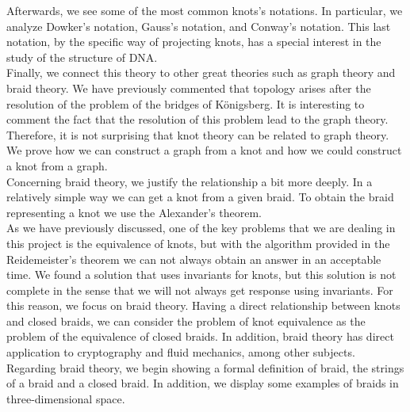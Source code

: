 Afterwards, we see some of the most common knots’s notations. In particular, we analyze Dowker's notation, Gauss's notation, and Conway's notation. This last notation, by the specific way of projecting knots, has a special interest in the study of the structure of DNA.\\


Finally, we connect this theory to other great theories such as graph theory and braid theory. We have previously commented that topology arises after the resolution of the problem of the bridges of Königsberg. It is interesting to comment the fact that the resolution of this problem lead to the graph theory. Therefore, it is not surprising that knot theory can be related to graph theory. We prove how we can construct a graph from a knot and how we could construct a knot from a graph.\\


Concerning braid theory, we justify the relationship a bit more deeply. In a relatively simple way we can get a knot from a given braid. To obtain the braid representing a knot we use the Alexander's theorem.\\








As we have previously discussed, one of the key problems that we are dealing in this project is the equivalence of knots, but with the algorithm provided in the Reidemeister's theorem we can not always obtain an answer in an acceptable time. We found a solution that uses invariants for knots, but this solution is not complete in the sense that we will not always get response using invariants. For this reason, we focus on braid theory. Having a direct relationship between knots and closed braids, we can consider the problem of knot equivalence as the problem of the equivalence of closed braids. In addition, braid theory has direct application to cryptography and fluid mechanics, among other subjects.\\








Regarding braid theory, we begin showing a formal definition of braid, the strings of a braid and a closed braid. In addition, we display some examples of braids in three-dimensional space.\\


